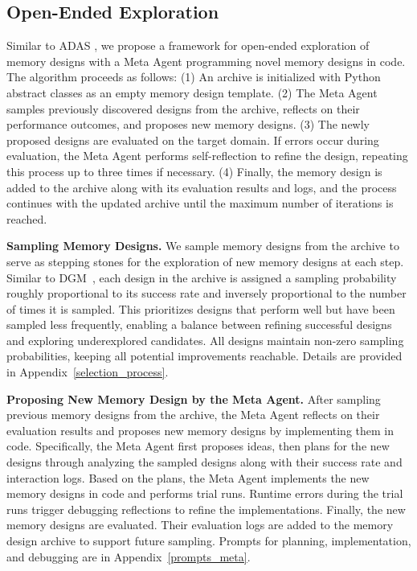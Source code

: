 \documentclass{article}
\theoremstyle{plain}
\theoremstyle{definition}
\theoremstyle{remark}
\begin{document}
\subsection{Open-Ended Exploration} %
Similar to ADAS \citep{hu2024ADAS}, we propose a framework for open-ended exploration of memory designs with a Meta Agent programming novel memory designs in code. 
The algorithm proceeds as follows: (1) An archive is initialized with Python abstract classes as an empty memory design template. (2) The Meta Agent samples previously discovered designs from the archive, reflects on their performance outcomes, and proposes new memory designs. (3) The newly proposed designs are evaluated on the target domain. If errors occur during evaluation, the Meta Agent performs self-reflection to refine the design, repeating this process up to three times if necessary. (4) Finally, the memory design is added to the archive along with its evaluation results and logs, and the process continues with the updated archive until the maximum number of iterations is reached.

\noindent\textbf{Sampling Memory Designs.}\hspace{0.5em} 
We sample memory designs from the archive to serve as stepping stones for the exploration of new memory designs at each step.
Similar to DGM~\citep{zhang2025darwin}, each design in the archive is assigned a sampling probability roughly proportional to its success rate and inversely proportional to the number of times it is sampled. This prioritizes designs that perform well but have been sampled less frequently, enabling a balance between refining successful designs and exploring underexplored candidates. All designs maintain non-zero sampling probabilities, keeping all potential improvements reachable.
Details are provided in Appendix~\ref{selection_process}.

\noindent\textbf{Proposing New Memory Design by the Meta Agent.}\hspace{0.5em} 
After sampling previous memory designs from the archive, the Meta Agent reflects on their evaluation results and proposes new memory designs by implementing them in code.
Specifically, the Meta Agent first proposes ideas, then plans for the new designs through analyzing the sampled designs along with their success rate and interaction logs.
Based on the plans, the Meta Agent implements the new memory designs in code and performs trial runs. Runtime errors during the trial runs trigger debugging reflections to refine the implementations.
Finally, the new memory designs are evaluated. Their evaluation logs are added to the memory design archive to support future sampling. 
Prompts for planning, implementation, and debugging are in Appendix~\ref{prompts_meta}.
\vspace{-0.6em}
\end{document}
